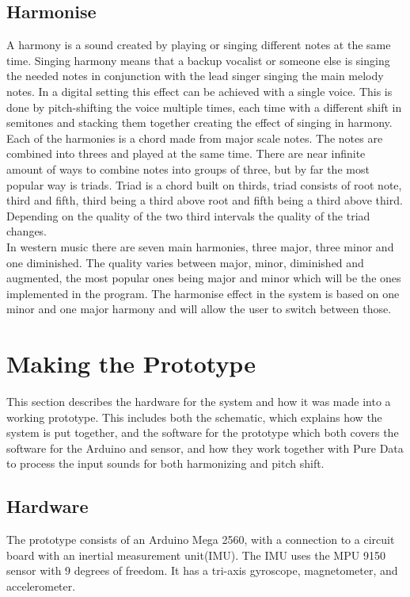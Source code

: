 \subsection{Harmonise}

A harmony is a sound created by playing or singing different notes at the same time\citep{Harmonise02}.
Singing harmony means that a backup vocalist or someone else is singing the needed notes in conjunction with the lead singer singing the main melody notes. In a digital setting this effect can be achieved with a single voice. This is done by pitch-shifting the voice multiple times, each time with a different shift in semitones and stacking them together creating the effect of singing in harmony. Each of the harmonies is a chord made from major scale notes.
The notes are combined into threes and played at the same time. There are near infinite amount of ways to combine notes into groups of three, but by far the most popular way is triads\citep{Harmonise01}. Triad is a chord built on thirds, triad consists of root note, third and fifth, third being a third above root and fifth being a third above third. Depending on the quality of the two third intervals the quality of the triad changes. \\
In western music there are seven main harmonies, three major, three minor and one diminished. The quality varies between major, minor, diminished and augmented, the most popular ones being major and minor which will be the ones implemented in the program. The harmonise effect in the system is based on one minor and one major harmony and will allow the user to switch between those.

\section{Making the Prototype}

This section describes the hardware for the system and how it was made into a working prototype. This includes both the schematic, which explains how the system is put together, and the software for the prototype which both covers the software for the Arduino and sensor, and how they work together with Pure Data to process the input sounds for both harmonizing and pitch shift.

\subsection{Hardware}

The prototype consists of an Arduino Mega 2560\citep{Arduino}, with a connection to a circuit board with an inertial measurement unit(IMU). 
The IMU uses the MPU 9150 sensor with 9 degrees of freedom\citep{MPU}. It has a tri-axis gyroscope, magnetometer, and accelerometer.

